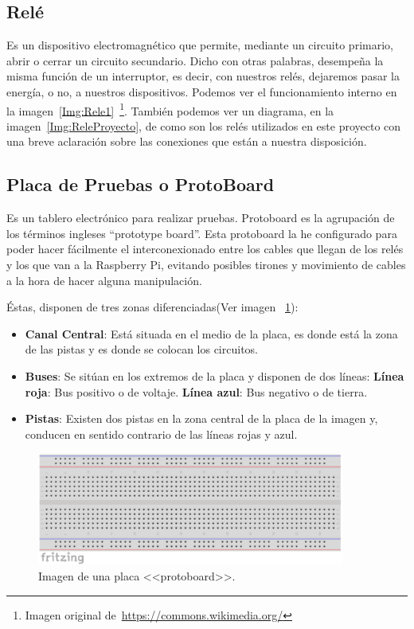 \subsection{Relé}\label{4:Relé}
Es un dispositivo electromagnético que permite, mediante un circuito primario, abrir o cerrar un circuito secundario. Dicho con otras palabras, desempeña la misma función de un interruptor, es decir, con nuestros relés, dejaremos pasar la energía, o no, a nuestros dispositivos. Podemos ver el funcionamiento interno en la imagen~\ref{Img:Rele1}~\footnote{Imagen original de~\url{https://commons.wikimedia.org/}}. También podemos ver un diagrama, en la imagen~\ref{Img:ReleProyecto}, de como son los relés utilizados en este proyecto con una breve aclaración sobre las conexiones que están a nuestra disposición.



\subsection{Placa de Pruebas o ProtoBoard}\label{4:protoboard}
Es un tablero electrónico para realizar pruebas. Protoboard es la agrupación de los términos ingleses “prototype board”.
Esta protoboard la he configurado para poder hacer fácilmente el interconexionado entre los cables que llegan de los relés y los que van a la Raspberry Pi, evitando posibles tirones y movimiento de cables a la hora de hacer alguna manipulación.

Éstas, disponen de tres zonas diferenciadas(Ver imagen ~\ref{Img:Protoboard}):

\begin{itemize}
    \item \textbf{Canal Central}: Está situada en el medio de la placa, es donde está la zona de las pistas y es donde se colocan los circuitos.
    \item \textbf{Buses}: Se sitúan en los extremos de la placa y disponen de dos líneas:
        \subitem \textbf{Línea roja}: Bus positivo o de voltaje.
        \subitem \textbf{Línea azul}: Bus negativo o de tierra.
    \item \textbf{Pistas}: Existen dos pistas en la zona central de la placa de la imagen y, conducen en sentido contrario de las líneas rojas y azul.
\end{itemize}

\begin{figure}
    \centering
    \includegraphics[width=0.9\textwidth]{img/protoboard.pdf}
    \caption{Imagen de una placa <<protoboard>>. } \label{Img:Protoboard}
\end{figure}

